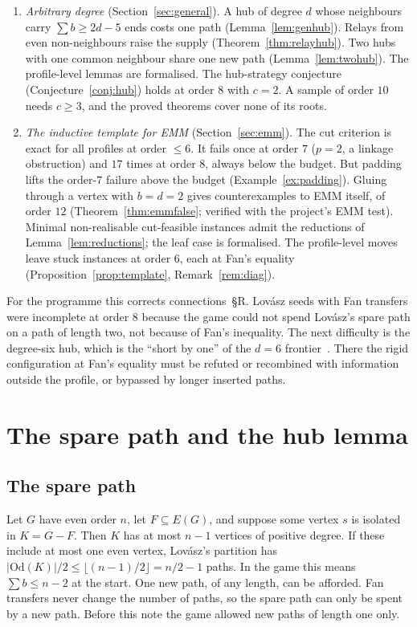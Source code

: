 \documentclass[11pt]{amsart}
\theoremstyle{definition}
\newcommand{\Od}{\mathrm{Od}}
\begin{document}
\begin{enumerate}
more edges and routing the inserted path through the hub along them. A profile-level
receipt-or-flower move with an edge count (Lemma~\ref{lem:rfcount}), together with the symmetry
of the root's orbit, wins all these graphs with a single held star.
\item \emph{Arbitrary degree} (Section~\ref{sec:general}). A hub of degree $d$ whose neighbours
carry $\sum b\ge2d-5$ ends costs one path (Lemma~\ref{lem:genhub}). Relays from even
non-neighbours raise the supply (Theorem~\ref{thm:relayhub}). Two hubs with one common neighbour
share one new path (Lemma~\ref{lem:twohub}). The profile-level lemmas are formalised. The
hub-strategy conjecture (Conjecture~\ref{conj:hub}) holds at order $8$ with $c=2$. A sample of
order $10$ needs $c\ge3$, and the proved theorems cover none of its roots.
\item \emph{The inductive template for EMM} (Section~\ref{sec:emm}). The cut criterion is exact for
all profiles at order $\le6$. It fails once at order $7$ ($p=2$, a linkage obstruction) and $17$
times at order $8$, always below the budget. But padding lifts the order-$7$ failure above the
budget (Example~\ref{ex:padding}). Gluing through a vertex with $b=d=2$ gives counterexamples to
EMM itself, of order $12$ (Theorem~\ref{thm:emmfalse}; verified with the project's EMM test). Minimal
non-realisable cut-feasible instances admit the reductions of Lemma~\ref{lem:reductions}; the leaf
case is formalised. The profile-level moves leave stuck instances at order $6$, each at Fan's
equality (Proposition~\ref{prop:template}, Remark~\ref{rem:diag}).
\end{enumerate}
For the programme this corrects connections~\S R. Lov\'asz seeds with Fan transfers were
incomplete at order $8$ because the game could not spend Lov\'asz's spare path on a path of length
two, not because of Fan's inequality. The next difficulty is the degree-six hub, which is the
``short by one'' of the $d=6$ frontier~\cite[Remark~3.5]{D6}. There the rigid configuration at
Fan's equality must be refuted or recombined with information outside the profile, or bypassed by
longer inserted paths.

\section{The spare path and the hub lemma}\label{sec:hub}

\subsection*{The spare path} Let $G$ have even order $n$, let $F\subseteq E(G)$, and suppose some
vertex $s$ is isolated in $K=G-F$. Then $K$ has at most $n-1$ vertices of positive degree. If
these include at most one even vertex, Lov\'asz's partition has $|\Od(K)|/2\le\lfloor
(n-1)/2\rfloor=n/2-1$ paths. In the game this means $\sum b\le n-2$ at the start. One new path,
of any length, can be afforded. Fan transfers never change the number of paths, so the spare path
can only be spent by a new path. Before this note the game allowed new paths of length one only.
\end{document}
